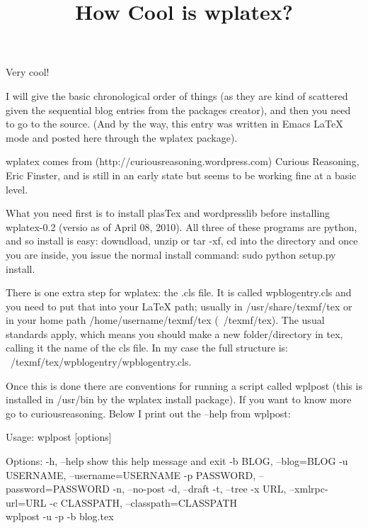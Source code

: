 \documentclass{wpblogentry}
\title{How Cool is wplatex?}
\begin{document}
Very cool!

I will give the basic chronological order of things (as they are kind of scattered given the sequential blog entries from the packages creator), and then you need to go to the source. (And by the way, this entry was written in Emacs LaTeX mode and posted here through the wplatex package).

wplatex comes from (http://curiousreasoning.wordpress.com) Curious Reasoning, Eric Finster, and is still in an early state but seems to be working fine at a basic level.

What you need first is to install plasTex and wordpresslib before installing wplatex-0.2 (versio as of April 08, 2010). All three of these programs are python, and so install is easy: downdload, unzip or tar -xf, cd into the directory and once you are inside, you issue the normal install command: sudo python setup.py install. 

There is one extra step for wplatex: the .cls file. It is called  wpblogentry.cls and you need to put that into your LaTeX path; usually in /usr/share/texmf/tex or in your home path /home/username/texmf/tex (~/texmf/tex). The usual standards apply, which means you should make a new folder/directory in tex, calling it the name of the cls file. In my case the full structure is:  ~/texmf/tex/wpblogentry/wpblogentry.cls.

Once this is done there are conventions for running a script called wplpost (this is installed in /usr/bin by the wplatex install package). If you want to know more go to curiousreasoning. Below I print out the --help from  wplpost:




Usage: wplpost [options]

Options:
  -h, --help show this help message and exit
  -b BLOG, --blog=BLOG 
  -u USERNAME, --username=USERNAME
  -p PASSWORD, --password=PASSWORD
  -n, --no-post   
   -d, --draft 
    -t, --tree 
  -x URL, --xmlrpc-url=URL
  -c CLASSPATH, --classpath=CLASSPATH
\\
wplpost -u -p -b blog.tex
\end{document}
